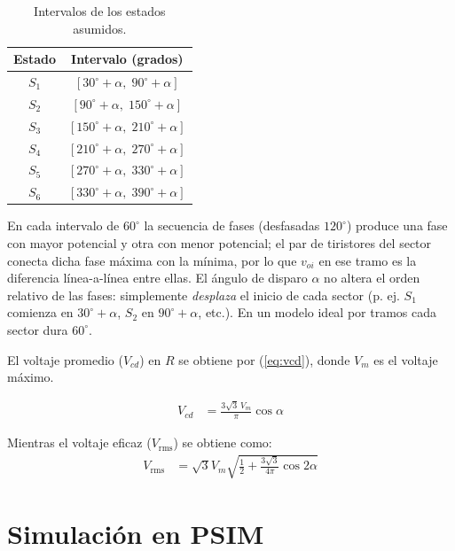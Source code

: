 \documentclass[conference]{IEEEtran}
\begin{document}

\begin{table}[h!]
	\centering
	\small
	\caption{Intervalos de los estados asumidos.}
	\begin{tabular}{@{}cc@{}}
		\toprule
		Estado & Intervalo (grados) \\ \midrule
	    $S_{1}$ & $[30^\circ+\alpha,\;90^\circ+\alpha]$ \\
		$S_{2}$ & $[90^\circ+\alpha,\;150^\circ+\alpha]$ \\
		$S_{3}$ & $[150^\circ+\alpha,\;210^\circ+\alpha]$ \\
		$S_{4}$ & $[210^\circ+\alpha,\;270^\circ+\alpha]$ \\
		$S_{5}$ & $[270^\circ+\alpha,\;330^\circ+\alpha]$ \\
		$S_{6}$ & $[330^\circ+\alpha,\;390^\circ+\alpha]$ \\ \bottomrule
	\end{tabular}
	
	\label{tab:estados_grados}
\end{table}

En cada intervalo de $60^\circ$ la secuencia de fases (desfasadas $120^\circ$) produce una fase 
con mayor potencial y otra con menor potencial; el par de tiristores del sector conecta dicha fase 
máxima con la mínima, por lo que $v_{oi}$ en ese tramo es la diferencia línea-a-línea entre ellas. 
El ángulo de disparo $\alpha$ no altera el orden relativo de las fases: simplemente \emph{desplaza} el inicio de cada sector (p. ej. $S_{1}$ comienza en $30^\circ+\alpha$, 
$S_{2}$ en $90^\circ+\alpha$, etc.). En un modelo ideal por tramos cada sector dura $60^\circ$.

El voltaje promedio ($V_{cd}$) en $R$ se obtiene por (\ref{eq:vcd}), donde $V_m$ es el voltaje máximo.

\begin{align}
    V_{cd} &= \frac{3\sqrt{3}\,V_m}{\pi} \cos\alpha	
	\label{eq:vcd}
\end{align}

Mientras el voltaje eficaz ($V_{\text{rms}}$) se obtiene como:
\begin{align*}	
    V_{\text{rms}} &= \sqrt{3}V_m\sqrt{\frac{1}{2} + \frac{3\sqrt{3}}{4\pi} \cos 2\alpha}
\end{align*}


\section{Simulación en PSIM}
\end{document}
